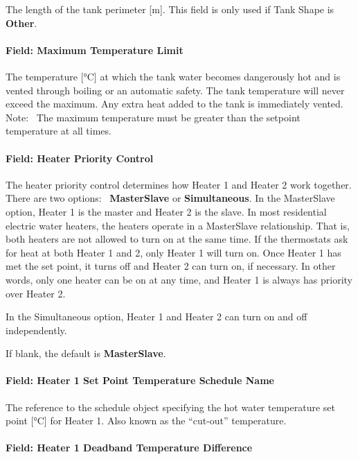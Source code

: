 The length of the tank perimeter {[}m{]}. This field is only used if Tank Shape is \textbf{Other}.

\paragraph{Field: Maximum Temperature Limit}\label{field-maximum-temperature-limit-1}

The temperature {[}°C{]} at which the tank water becomes dangerously hot and is vented through boiling or an automatic safety. The tank temperature will never exceed the maximum. Any extra heat added to the tank is immediately vented. Note:~ The maximum temperature must be greater than the setpoint temperature at all times.

\paragraph{Field: Heater Priority Control}\label{field-heater-priority-control}

The heater priority control determines how Heater 1 and Heater 2 work together. There are two options:~ \textbf{MasterSlave} or \textbf{Simultaneous}. In the MasterSlave option, Heater 1 is the master and Heater 2 is the slave. In most residential electric water heaters, the heaters operate in a MasterSlave relationship. That is, both heaters are not allowed to turn on at the same time. If the thermostats ask for heat at both Heater 1 and 2, only Heater 1 will turn on. Once Heater 1 has met the set point, it turns off and Heater 2 can turn on, if necessary. In other words, only one heater can be on at any time, and Heater 1 is always has priority over Heater 2.

In the Simultaneous option, Heater 1 and Heater 2 can turn on and off independently.

If blank, the default is \textbf{MasterSlave}.

\paragraph{Field: Heater 1 Set Point Temperature Schedule Name}\label{field-heater-1-set-point-temperature-schedule-name}

The reference to the schedule object specifying the hot water temperature set point {[}°C{]} for Heater 1. Also known as the ``cut-out'' temperature.

\paragraph{Field: Heater 1 Deadband Temperature Difference}\label{field-heater-1-deadband-temperature-difference}

